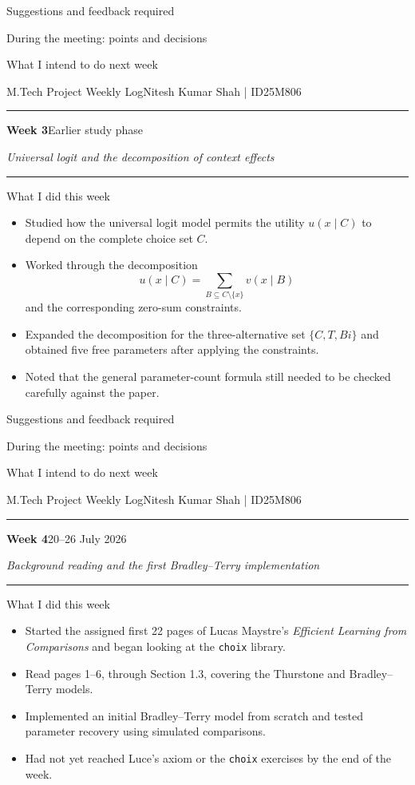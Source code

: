 \documentclass[10pt]{article}
\newcommand{\weekheading}[3]{%
  {\small M.Tech Project Weekly Log}\hfill{\small Nitesh Kumar Shah \;|\; ID25M806}\par
  \vspace{2pt}\hrule\vspace{7pt}
  {\Large\bfseries Week #1}\hfill{\normalsize #2}\par
  \vspace{2pt}
  {\itshape #3}\par
  \vspace{5pt}\hrule\vspace{7pt}
}
\newcommand{\blankentry}{\begin{center}\textemdash\end{center}}
\newcommand{\pastweekboxes}{%
  \begin{weeklybox}{Suggestions and feedback required}
    \blankentry
  \end{weeklybox}
  \begin{weeklybox}{During the meeting: points and decisions}
    \blankentry
  \end{weeklybox}
  \begin{weeklybox}{What I intend to do next week}
    \blankentry
  \end{weeklybox}
}
\begin{document}
\pastweekboxes


\newpage
\weekheading{3}{Earlier study phase}{Universal logit and the decomposition of context effects}

\begin{weeklybox}{What I did this week}
  \begin{itemize}
    \item Studied how the universal logit model permits the utility $u(x\mid C)$ to depend on the complete choice set $C$.
    \item Worked through the decomposition
    \[
      u(x\mid C)=\sum_{B\subseteq C\setminus\{x\}}v(x\mid B)
    \]
    and the corresponding zero-sum constraints.
    \item Expanded the decomposition for the three-alternative set $\{C,T,Bi\}$ and obtained five free parameters after applying the constraints.
    \item Noted that the general parameter-count formula still needed to be checked carefully against the paper.
  \end{itemize}
\end{weeklybox}

\pastweekboxes


\newpage
\weekheading{4}{20--26 July 2026}{Background reading and the first Bradley--Terry implementation}

\begin{weeklybox}{What I did this week}
  \begin{itemize}
    \item Started the assigned first 22 pages of Lucas Maystre's \emph{Efficient Learning from Comparisons} and began looking at the \texttt{choix} library.
    \item Read pages 1--6, through Section 1.3, covering the Thurstone and Bradley--Terry models.
    \item Implemented an initial Bradley--Terry model from scratch and tested parameter recovery using simulated comparisons.
    \item Had not yet reached Luce's axiom or the \texttt{choix} exercises by the end of the week.
  \end{itemize}
\end{weeklybox}
\end{document}
